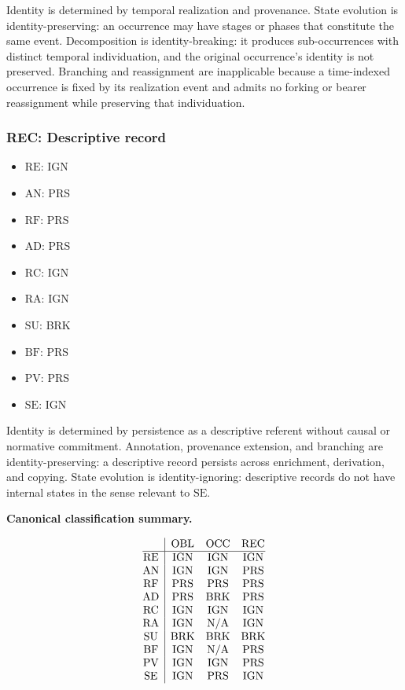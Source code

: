 Identity is determined by temporal realization and provenance.
State evolution is identity-preserving: an occurrence may have
stages or phases that constitute the same event.
Decomposition is identity-breaking: it produces sub-occurrences
with distinct temporal individuation, and the original occurrence's
identity is not preserved.
Branching and reassignment are inapplicable because a time-indexed
occurrence is fixed by its realization event and admits no forking
or bearer reassignment while preserving that individuation.

\subsubsection{REC: Descriptive record}

\begin{itemize}
\item $\mathrm{RE}$: IGN
\item $\mathrm{AN}$: PRS
\item $\mathrm{RF}$: PRS
\item $\mathrm{AD}$: PRS
\item $\mathrm{RC}$: IGN
\item $\mathrm{RA}$: IGN
\item $\mathrm{SU}$: BRK
\item $\mathrm{BF}$: PRS
\item $\mathrm{PV}$: PRS
\item $\mathrm{SE}$: IGN
\end{itemize}

Identity is determined by persistence as a descriptive referent
without causal or normative commitment.
Annotation, provenance extension, and branching are identity-preserving:
a descriptive record persists across enrichment, derivation, and copying.
State evolution is identity-ignoring: descriptive records do not
have internal states in the sense relevant to $\mathrm{SE}$.

\medskip
\noindent\textbf{Canonical classification summary.}

\[
\begin{array}{@{}c|ccc@{}}
 & \mathrm{OBL} & \mathrm{OCC} & \mathrm{REC} \\
\hline
\mathrm{RE} & \mathrm{IGN} & \mathrm{IGN} & \mathrm{IGN} \\
\mathrm{AN} & \mathrm{IGN} & \mathrm{IGN} & \mathrm{PRS} \\
\mathrm{RF} & \mathrm{PRS} & \mathrm{PRS} & \mathrm{PRS} \\
\mathrm{AD} & \mathrm{PRS} & \mathrm{BRK} & \mathrm{PRS} \\
\mathrm{RC} & \mathrm{IGN} & \mathrm{IGN} & \mathrm{IGN} \\
\mathrm{RA} & \mathrm{IGN} & \mathrm{N/A} & \mathrm{IGN} \\
\mathrm{SU} & \mathrm{BRK} & \mathrm{BRK} & \mathrm{BRK} \\
\mathrm{BF} & \mathrm{IGN} & \mathrm{N/A} & \mathrm{PRS} \\
\mathrm{PV} & \mathrm{IGN} & \mathrm{IGN} & \mathrm{PRS} \\
\mathrm{SE} & \mathrm{IGN} & \mathrm{PRS} & \mathrm{IGN} \\
\end{array}
\]
